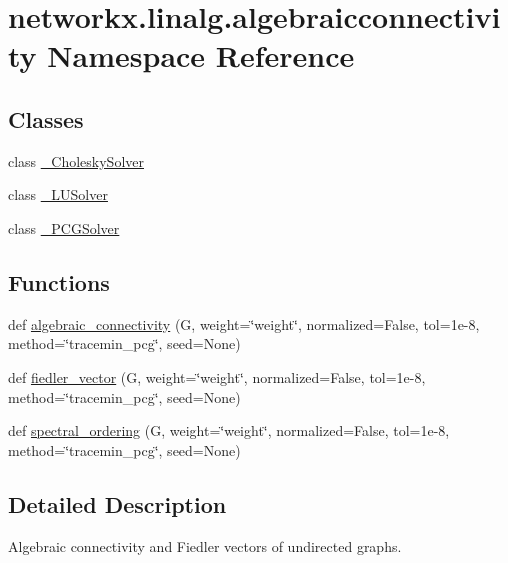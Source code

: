 \hypertarget{namespacenetworkx_1_1linalg_1_1algebraicconnectivity}{}\section{networkx.\+linalg.\+algebraicconnectivity Namespace Reference}
\label{namespacenetworkx_1_1linalg_1_1algebraicconnectivity}
\subsection*{Classes}
\begin{DoxyCompactItemize}
\item 
class \hyperlink{classnetworkx_1_1linalg_1_1algebraicconnectivity_1_1__CholeskySolver}{\+\_\+\+Cholesky\+Solver}
\item 
class \hyperlink{classnetworkx_1_1linalg_1_1algebraicconnectivity_1_1__LUSolver}{\+\_\+\+L\+U\+Solver}
\item 
class \hyperlink{classnetworkx_1_1linalg_1_1algebraicconnectivity_1_1__PCGSolver}{\+\_\+\+P\+C\+G\+Solver}
\end{DoxyCompactItemize}
\subsection*{Functions}
\begin{DoxyCompactItemize}
\item 
def \hyperlink{namespacenetworkx_1_1linalg_1_1algebraicconnectivity_abf07069cd8baafec751f7be25880c595}{algebraic\+\_\+connectivity} (G, weight=\char`\"{}weight\char`\"{}, normalized=False, tol=1e-\/8, method=\char`\"{}tracemin\+\_\+pcg\char`\"{}, seed=\+None)
\item 
def \hyperlink{namespacenetworkx_1_1linalg_1_1algebraicconnectivity_a862b00cdd972ff366199b0e3b8a42a4c}{fiedler\+\_\+vector} (G, weight=\char`\"{}weight\char`\"{}, normalized=False, tol=1e-\/8, method=\char`\"{}tracemin\+\_\+pcg\char`\"{}, seed=\+None)
\item 
def \hyperlink{namespacenetworkx_1_1linalg_1_1algebraicconnectivity_a51ebf49ae3fabf3461120a0a4b8007a7}{spectral\+\_\+ordering} (G, weight=\char`\"{}weight\char`\"{}, normalized=False, tol=1e-\/8, method=\char`\"{}tracemin\+\_\+pcg\char`\"{}, seed=\+None)
\end{DoxyCompactItemize}


\subsection{Detailed Description}
\begin{DoxyVerb}Algebraic connectivity and Fiedler vectors of undirected graphs.
\end{DoxyVerb}
 

